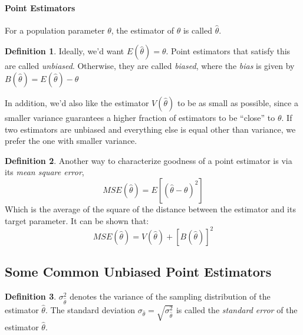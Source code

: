 \documentclass[12 pt]{article}
\theoremstyle{definition}
\newtheorem{defn}{Definition}
\begin{document}
        \paragraph{Point Estimators} For a population parameter
        $\theta$, the estimator of $\theta$ is called $\hat{\theta}$.
        \begin{defn}
        Ideally, we'd want $E(\hat{\theta}) = \theta$. Point
        estimators that satisfy this are called
        \textit{unbiased}. Otherwise, they are called \textit{biased},
        where the \textit{bias} is given by
        $B(\hat{\theta})=E(\hat{\theta})-\theta$
      \end{defn}
      In addition, we'd also like the estimator $V(\hat{\theta})$ to
      be as small as possible, since a smaller variance guarantees a
      higher fraction of estimators to be ``close'' to $\theta$. If
      two estimators are unbiased and everything else is equal other
      than variance, we prefer the one with smaller variance.
      \begin{defn}
        Another way to characterize goodness of a point estimator is
        via its \textit{mean square error},
        $$MSE(\hat{\theta}) = E[(\hat{\theta}-\theta)^2]$$
        Which is the average of the square of the distance between the
        estimator and its target parameter. It can be shown that:
        $$MSE(\hat{\theta})=V(\hat{\theta})+[B(\hat{\theta})]^2$$
      \end{defn}
      \subsection{Some Common Unbiased Point Estimators}
      \begin{defn}
        $\sigma_{\hat{\theta}}^2$ denotes the variance of the sampling
        distribution of the estimator $\hat{\theta}$. The standard
        deviation $\sigma_{\hat{\theta}} =
        \sqrt{\sigma_{\hat{\theta}}^2}$ is called the \textit{standard
        error} of the estimator $\hat{\theta}$.
    \end{defn}
\end{document}
